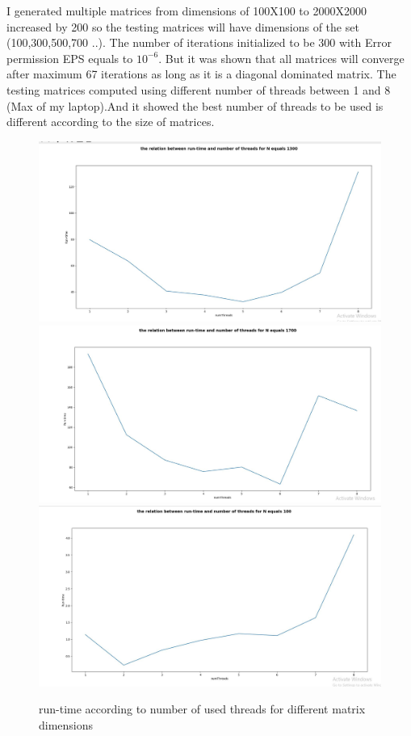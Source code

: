 \documentclass[preprint,pre,floats,aps,amsmath,amssymb]{revtex4}
\begin{document}
I generated multiple matrices from dimensions of 100X100 to 2000X2000 increased by 200 so the testing matrices will have dimensions of the set (100,300,500,700 ..). The number of iterations initialized to be 300 with Error permission EPS equals to $10^{-6}$. But it was shown that all matrices will converge after maximum 67 iterations as long as it is a diagonal dominated matrix.
The testing matrices computed using different number of threads between 1 and 8 (Max of my laptop).And it showed the best number of threads to be used is different according to the size of matrices.
 \begin{figure}[H]

 	\caption{run-time according to number of used threads for different matrix dimensions}
 	\includegraphics[scale=0.25]{3}
 	 	\includegraphics[scale=0.25]{4}
 	 	 	\includegraphics[scale=0.25]{5}
 	
 \end{figure}
\end{document}
